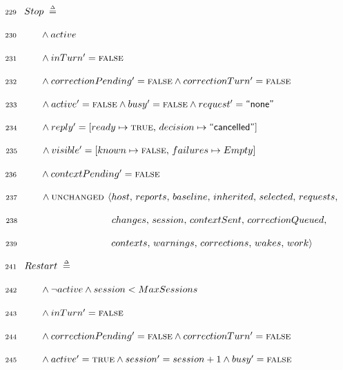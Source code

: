 \documentclass{article}
\makeatletter
\newcommand{\defeq}{\;\mathrel{\smash   %
    {{\stackrel{\scriptscriptstyle\Delta}{=}}}}\;}
\newcommand{\FALSE}{\textsc{false}}
\newcommand{\TRUE}{\textsc{true}}
\newcommand{\UNCHANGED}{\textsc{unchanged }}
\renewcommand{\_}{\rule{.4em}{.06em}\hspace{.05em}}
\newif\ifpcalshading \pcalshadingfalse
\newlength{\pcalvspace}\setlength{\pcalvspace}{0pt}%
\newcommand{\@pvspace}[1]{%
  \ifpcalshading
     \par\global\setlength{\pcalvspace}{#1}%
  \else
     \par\vspace{#1}%
  \fi
}
\renewcommand{\.}[1]{\ensuremath{\mbox{}#1\mbox{}}}
\newcommand{\@s}[1]{\hspace{#1pt}}
\newlength{\@xlen}
\newcommand\xtstrut%
  {\setlength{\@xlen}{1.05em}%
   \addtolength{\@xlen}{\pcalvspace}%
    \raisebox{\vshadelen}{\raisebox{-.25em}{\rule{0pt}{\@xlen}}}%
   \global\setlength{\vshadelen}{0pt}%
   \global\setlength{\pcalvspace}{0pt}}
\newcommand{\@x}[1]{\par
  \ifpcalshading
  \makebox[0pt][l]{\shadebox{\xtstrut\hspace*{\textwidth}}}%
  \fi
  \mbox{$\mbox{}#1\mbox{}$}}
\newcommand{\@w}[1]{\textsf{``{#1}''}}
\def\graymargin{1}
\newlength{\templena}
\newlength{\templenb}
\newcommand{\shadebox}[1]{{\setlength{\fboxsep}{\graymargin pt}%
     \savebox{\tempboxa}{#1}%
     \settoheight{\templena}{\usebox{\tempboxa}}%
     \settodepth{\templenb}{\usebox{\tempboxa}}%
     \hspace*{-\fboxsep}\raisebox{0pt}[\templena][\templenb]%
        {\colorbox{boxshade}{\usebox{\tempboxa}}}\hspace*{-\fboxsep}}}
\newlength{\vshadelen}
\makeatother
\begin{document}
\@x{\makebox[0pt][r]{\scriptsize 229\hspace{1em}} Stop \.{\defeq}}%
\@x{\makebox[0pt][r]{\scriptsize 230\hspace{1em}}\@s{16.4} \.{\land} active}%
 \@x{\makebox[0pt][r]{\scriptsize 231\hspace{1em}}\@s{16.4} \.{\land} inTurn
 \.{'} \.{=} {\FALSE}}%
 \@x{\makebox[0pt][r]{\scriptsize 232\hspace{1em}}\@s{16.4} \.{\land}
 correctionPending \.{'} \.{=} {\FALSE} \.{\land} correctionTurn \.{'} \.{=}
 {\FALSE}}%
 \@x{\makebox[0pt][r]{\scriptsize 233\hspace{1em}}\@s{16.4} \.{\land} active
 \.{'} \.{=} {\FALSE} \.{\land} busy \.{'} \.{=} {\FALSE} \.{\land} request
 \.{'} \.{=}\@w{none}}%
 \@x{\makebox[0pt][r]{\scriptsize 234\hspace{1em}}\@s{16.4} \.{\land} reply
 \.{'} \.{=} [ ready \.{\mapsto} {\TRUE} ,\, decision
 \.{\mapsto}\@w{cancelled} ]}%
 \@x{\makebox[0pt][r]{\scriptsize 235\hspace{1em}}\@s{16.4} \.{\land} visible
 \.{'} \.{=} [ known \.{\mapsto} {\FALSE} ,\, failures \.{\mapsto} Empty ]}%
 \@x{\makebox[0pt][r]{\scriptsize 236\hspace{1em}}\@s{16.4} \.{\land}
 contextPending \.{'} \.{=} {\FALSE}}%
 \@x{\makebox[0pt][r]{\scriptsize 237\hspace{1em}}\@s{16.4} \.{\land}
 {\UNCHANGED} {\langle} host ,\, reports ,\, baseline ,\, inherited ,\,
 selected ,\, requests ,\,}%
 \@x{\makebox[0pt][r]{\scriptsize 238\hspace{1em}}\@s{89.98} changes ,\,
 session ,\, contextSent ,\, correctionQueued ,\,}%
 \@x{\makebox[0pt][r]{\scriptsize 239\hspace{1em}}\@s{89.98} contexts ,\,
 warnings ,\, corrections ,\, wakes ,\, work {\rangle}}%
\@pvspace{8.0pt}%
\@x{\makebox[0pt][r]{\scriptsize 241\hspace{1em}} Restart \.{\defeq}}%
 \@x{\makebox[0pt][r]{\scriptsize 242\hspace{1em}}\@s{16.4} \.{\land} {\lnot}
 active \.{\land} session \.{<} MaxSessions}%
 \@x{\makebox[0pt][r]{\scriptsize 243\hspace{1em}}\@s{16.4} \.{\land} inTurn
 \.{'} \.{=} {\FALSE}}%
 \@x{\makebox[0pt][r]{\scriptsize 244\hspace{1em}}\@s{16.4} \.{\land}
 correctionPending \.{'} \.{=} {\FALSE} \.{\land} correctionTurn \.{'} \.{=}
 {\FALSE}}%
 \@x{\makebox[0pt][r]{\scriptsize 245\hspace{1em}}\@s{16.4} \.{\land} active
 \.{'} \.{=} {\TRUE} \.{\land} session \.{'} \.{=} session \.{+} 1 \.{\land}
 busy \.{'} \.{=} {\FALSE}}%
\end{document}
